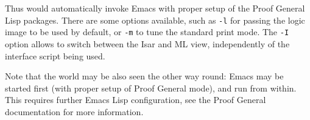 \begin{isabellebody}
\begin{isamarkuptext}
  Thus \hyperlink{executable.Isabelle}{\mbox{}} would automatically invoke Emacs with
  proper setup of the Proof General Lisp packages.  There are some
  options available, such as \verb|-l| for passing the logic
  image to be used by default, or \verb|-m| to tune the
  standard print mode.  The \verb|-I| option allows to switch
  between the Isar and ML view, independently of the interface script
  being used.
  
  \medskip Note that the world may be also seen the other way round:
  Emacs may be started first (with proper setup of Proof General
  mode), and \hyperlink{executable.isabelle}{\mbox{}} run from within.  This requires
  further Emacs Lisp configuration, see the Proof General
  documentation \cite{proofgeneral} for more information.%
\end{isamarkuptext}%
\isamarkuptrue%
%
\isadelimtheory
%
\endisadelimtheory
%
\isatagtheory
{}\isamarkupfalse%
%
\endisatagtheory
{\isafoldtheory}%
%
\isadelimtheory
%
\endisadelimtheory
\end{isabellebody}%
